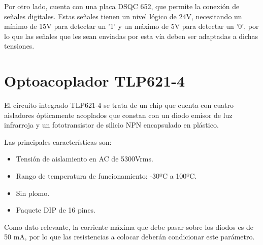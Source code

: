 Por otro lado, cuenta con una placa DSQC 652, que permite la conexión de señales digitales. Estas señales tienen
un nivel lógico de 24V, necesitando un mínimo de 15V para detectar un '1' y un máximo de 5V para detectar un '0',
por lo que las señales que les sean enviadas por esta vía deben ser adaptadas a dichas tensiones.

\section{Optoacoplador TLP621-4}

El circuito integrado TLP621-4 se trata de un chip que cuenta con cuatro aisladores ópticamente acoplados que constan
con un diodo emisor de luz infrarroja y un fototransistor de silicio NPN encapsulado en plástico.

Las principales características son:
\begin{itemize}
    \item Tensión de aislamiento en AC de 5300Vrms.
    \item Rango de temperatura de funcionamiento: -30ºC a 100ºC.
    \item Sin plomo.
    \item Paquete DIP de 16 pines.
\end{itemize}

Como dato relevante, la corriente máxima que debe pasar sobre los diodos es de 50 mA, por lo que las
resistencias a colocar deberán condicionar este parámetro.